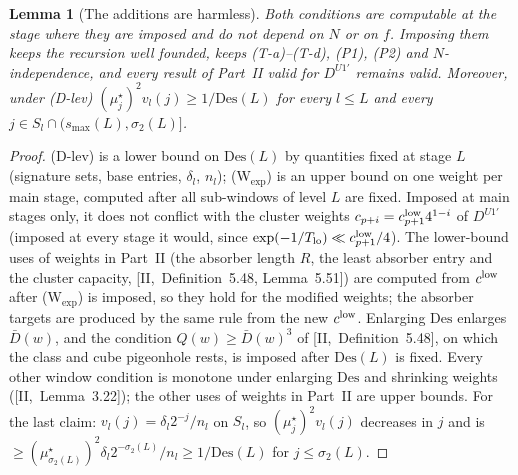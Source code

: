 \documentclass[10pt]{amsart}
\newtheorem{lemma}[theorem]{Lemma}
\theoremstyle{definition}
\theoremstyle{remark}
\begin{document}
\begin{lemma}[The additions are harmless]\label{lem:III-designadd}
Both conditions are computable at the stage where they are imposed and do not
depend on $N$ or on $f$.  Imposing them keeps the recursion well founded, keeps
\textup{(T-a)--(T-d)}, \textup{(P1)}, \textup{(P2)} and $N$-independence, and every
result of Part~II valid for $D^{U1'}$ remains valid.  Moreover, under (D-lev)
$(\mu^\star_{j})^2v_l(j)\ge1/\mathrm{Des}(L)$ for every $l\le L$ and every
$j\in S_l\cap(s_{\max}(L),\sigma_2(L)]$.
\end{lemma}

\begin{proof}
(D-lev) is a lower bound on $\mathrm{Des}(L)$ by quantities fixed at stage $L$
(signature sets, base entries, $\delta_l$, $n_l$); (W$_{\exp}$) is an upper bound
on one weight per main stage, computed after all sub-windows of level $L$ are
fixed.  Imposed at main stages only, it does not conflict with the cluster weights
$c_{p+i}=c^{\rm low}_{p+1}4^{1-i}$ of $D^{U1'}$ (imposed at every stage it would,
since $\exp(-1/T_{\rm lo})\ll c^{\rm low}_{p+1}/4$).  The lower-bound uses
of weights in Part~II (the absorber length $R$, the least absorber entry
and the cluster capacity, [II,~Definition~5.48, Lemma~5.51]) are computed
from $c^{\rm low}$ after (W$_{\exp}$) is imposed, so they hold for the
modified weights; the absorber targets are produced by the same rule from
the new $c^{\rm low}$.  Enlarging $\mathrm{Des}$ enlarges $\bar D(w)$, and the
condition $Q(w)\ge\bar D(w)^3$ of [II,~Definition~5.48], on which the
class and cube pigeonhole rests, is imposed after $\mathrm{Des}(L)$ is fixed.
Every other window condition is monotone under enlarging $\mathrm{Des}$ and
shrinking weights ([II,~Lemma~3.22]); the other uses of weights in Part~II
are upper bounds.  For the last
claim: $v_l(j)=\delta_l2^{-j}/n_l$ on $S_l$, so $(\mu^\star_j)^2v_l(j)$ decreases
in $j$ and is $\ge(\mu^\star_{\sigma_2(L)})^2\delta_l2^{-\sigma_2(L)}/n_l\ge
1/\mathrm{Des}(L)$ for $j\le\sigma_2(L)$.
\end{proof}
\end{document}
